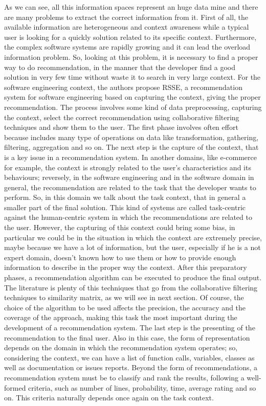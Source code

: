 As we can see, all this information spaces represent an huge data mine and there are many problems to extract the correct information from it. First of all, the available information are heterogeneous and context awareness while a typical user is looking for a quickly solution related to its specific context. Furthermore, the complex software systems are rapidly growing and it can lead the overload information problem. So, looking at this problem, it is necessary to find a proper way to do recommendation, in the manner that the developer find a good solution in very few time without waste it to search in very large context. For the software engineering context, the authors propose RSSE, a recommendation system for software engineering based on capturing the context, giving the proper recommendation. The process involves some kind of data preprocessing, capturing the context, select the correct recommendation using collaborative filtering techniques and show them to the user. The first phase involves often effort because includes many type of operations on data like transformation, gathering, filtering, aggregation and so on. The next step is the capture of the context, that is a key issue in a recommendation system. In another domains, like e-commerce for example, the context is strongly related to the user's characteristics and its behaviours; reversely, in the software engineering and in the software domain in general, the recommendation are related to the task that the developer wants to perform. So, in this domain we talk about the task context, that in general a smaller part of the final solution. This kind of systems are called task-centric against the human-centric system in which the recommendations are related to the user. However, the capturing of this context could bring some bias, in particular we could be in the situation in which the context are extremely precise, maybe because we have a lot of information, but the user, especially if he is a not expert domain, doesn't known how to use them or how to provide enough information to describe in the proper way the context. After this preparatory phases, a recommendation algorithm can be executed to produce the final output. The literature is plenty of this techniques that go from the collaborative filtering techniques to similarity matrix, as we will see in next section. Of course, the choice of the algorithm to be used affects the precision, the accuracy and the coverage of the approach, making this task the most important during the development of a recommendation system. The last step is the presenting of the recommendation to the final user. Also in this case, the form of representation depends on the domain in which the recommendation system operates; so, considering the context, we can have a list of function calls, variables, classes as well as documentation or issues reports. Beyond the form of recommendations, a recommendation system must be to classify and rank the results, following a well-formed criteria, such as number of lines, probability, time, average rating and so on. This criteria naturally depends once again on the task context. \newline

